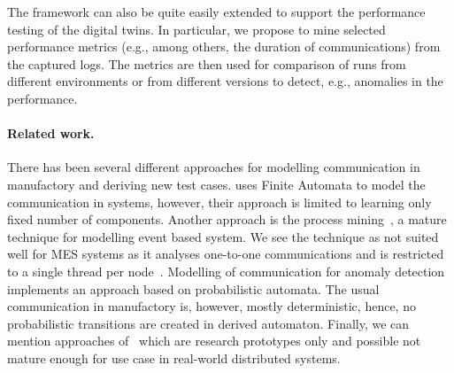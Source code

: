 {%

The framework can also be quite easily extended to support the performance
testing of the digital twins.
%
In particular, we propose to mine selected performance metrics (e.g., among
others, the duration of communications) from the captured logs.
%
The metrics are then used for comparison of runs from different environments or
from different versions to detect, e.g., anomalies in the performance.
%

\paragraph{Related work.} There has been several different approaches for
modelling communication in manufactory and deriving new test cases.
%
\cite{csight} uses Finite Automata to model the communication in systems,
however, their approach is limited to learning only fixed number of components.
%
Another approach is the process mining~\cite{procmin}, a mature technique for
modelling event based system. We see the technique as not suited well for MES
systems as it analyses one-to-one communications and is restricted to a single
thread per node~\cite{procmindist}.
%
%
Modelling of communication for anomaly detection~\cite{havlena} implements an
approach based on probabilistic automata.  
%
The usual communication in manufactory is, however, mostly deterministic,
hence, no probabilistic transitions are created in derived automaton.  
%
Finally, we can mention approaches of~\cite{prospex,icpn08,wcre09} which are
research prototypes only and possible not mature enough for use case in
real-world distributed systems.

}

